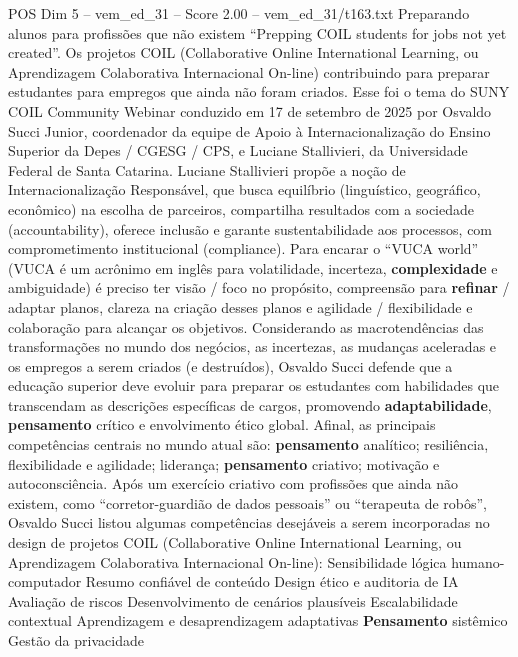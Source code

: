 \begin{textsample}{POS Dim 5 – vem\_ed\_31 – Score 2.00 – vem\_ed\_31/t163.txt}  \label{ex:f5_pos_049}
Preparando alunos para profissões que não existem “Prepping COIL students for jobs not yet created”.
Os projetos COIL (Collaborative Online International Learning, ou Aprendizagem Colaborativa Internacional On-line) contribuindo para preparar estudantes para empregos que ainda não foram criados.
Esse foi o tema do SUNY COIL Community Webinar conduzido em 17 de setembro de 2025 por Osvaldo Succi Junior, coordenador da equipe de Apoio à Internacionalização do Ensino Superior da Depes / CGESG / CPS, e Luciane Stallivieri, da Universidade Federal de Santa Catarina.
Luciane Stallivieri propõe a noção de Internacionalização Responsável, que busca equilíbrio (linguístico, geográfico, econômico) na escolha de parceiros, compartilha resultados com a sociedade (accountability), oferece inclusão e garante sustentabilidade aos processos, com comprometimento institucional (compliance).
Para encarar o “VUCA world” (VUCA é um acrônimo em inglês para volatilidade, incerteza, \textbf{complexidade} e ambiguidade) é preciso ter visão / foco no propósito, compreensão para \textbf{refinar} / adaptar planos, clareza na criação desses planos e agilidade / flexibilidade e colaboração para alcançar os objetivos.
Considerando as macrotendências das transformações no mundo dos negócios, as incertezas, as mudanças aceleradas e os empregos a serem criados (e destruídos), Osvaldo Succi defende que a educação superior deve evoluir para preparar os estudantes com habilidades que transcendam as descrições específicas de cargos, promovendo \textbf{adaptabilidade}, \textbf{pensamento} crítico e envolvimento ético global.
Afinal, as principais competências centrais no mundo atual são: \textbf{pensamento} analítico; resiliência, flexibilidade e agilidade; liderança; \textbf{pensamento} criativo; motivação e autoconsciência.
Após um exercício criativo com profissões que ainda não existem, como “corretor-guardião de dados pessoais” ou “terapeuta de robôs”, Osvaldo Succi listou algumas competências desejáveis a serem incorporadas no design de projetos COIL (Collaborative Online International Learning, ou Aprendizagem Colaborativa Internacional On-line): Sensibilidade lógica humano-computador Resumo confiável de conteúdo Design ético e auditoria de IA Avaliação de riscos Desenvolvimento de cenários plausíveis Escalabilidade contextual Aprendizagem e desaprendizagem adaptativas \textbf{Pensamento} sistêmico Gestão da privacidade

\end{textsample}
